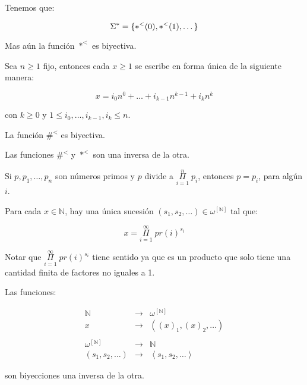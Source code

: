   \begin{lemma}
    \PN Tenemos que:

    \[
      \Sigma^{\ast} = \{\ast^{<}(0), \ast^{<}(1), \dotsc\}
    \]

    \PN Mas aún la función $\ast^{<}$ es biyectiva.
  \end{lemma}

  \begin{lemma}
    \PN Sea $n \geq 1$ fijo, entonces cada $x \geq 1$ se escribe en forma única de la siguiente manera:

    \[
      x = i_{0} n^{0} + \dotsc + i_{k-1} n^{k-1} + i_{k} n^{k}
    \]

    \PN con $k\geq 0$ y $1 \leq i_{0}, \dotsc, i_{k-1}, i_{k} \leq n$.
  \end{lemma}

  \begin{lemma}
    \PN La función $\#^{<}$ es biyectiva.
  \end{lemma}

  \begin{lemma}
    \PN Las funciones $\#^{<}$ y $\ast^{<}$ son una inversa de la otra.
  \end{lemma}

  \begin{lemma}
    \PN Si $p, p_{1}, \dotsc, p_{n}$ son números primos y $p$ divide a $\underset{i=1}{\overset{n}{\Pi}} \; p_{i}$,
    entonces $p = p_{i}$, para algún $i$.
  \end{lemma}

  \begin{theorem}
    \PN Para cada $x \in \mathbb{N}$, hay una única sucesión $(s_{1}, s_{2}, \dotsc) \in
    \omega^{\left[\mathbb{N}\right]}$ tal que:

    \[
      x = \underset{i=1}{\overset{\infty}{\Pi}} \; pr(i)^{s_{i}}
    \]

    \PN Notar que $\underset{i=1}{\overset{\infty}{\Pi}} \; pr(i)^{s_{i}}$ tiene sentido ya que es un producto que solo
    tiene una cantidad finita de factores no iguales a 1.
  \end{theorem}

  \begin{lemma}
    \PN Las funciones:

    \begin{eqnarray}
    	\nonumber \mathbb{N} &\rightarrow& \omega^{\left[\mathbb{N}\right]} \\
    	\nonumber x &\rightarrow& ((x)_{1}, (x)_{2}, \dotsc) \\
      \nonumber \\
      \nonumber \omega^{\left[\mathbb{N}\right]} &\rightarrow& \mathbb{N} \\
      \nonumber (s_{1}, s_{2}, \dotsc) &\rightarrow& \left\langle s_{1}, s_{2}, \dotsc \right\rangle
  	\end{eqnarray}

    \PN son biyecciones una inversa de la otra.
  \end{lemma}

